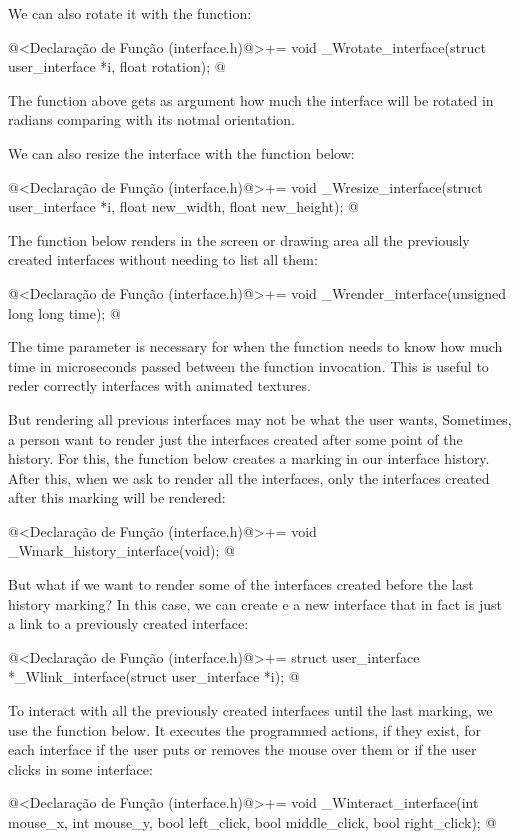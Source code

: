 We can also rotate it with the function:

\iniciocodigo
@<Declaração de Função (interface.h)@>+=
void _Wrotate_interface(struct user_interface *i, float rotation);
@
\fimcodigo

The function above gets as argument how much the interface will be
rotated in radians comparing with its notmal orientation.

We can also resize the interface with the function below:

\iniciocodigo
@<Declaração de Função (interface.h)@>+=
void _Wresize_interface(struct user_interface *i,
                        float new_width, float new_height);
@
\fimcodigo

The function below renders in the screen or drawing area all the
previously created interfaces without needing to list all them:

\iniciocodigo
@<Declaração de Função (interface.h)@>+=
void _Wrender_interface(unsigned long long time);
@
\fimcodigo

The time parameter is necessary for when the function needs to know
how much time in microseconds passed between the function
invocation. This is useful to reder correctly interfaces with animated
textures.

But rendering all previous interfaces may not be what the user wants,
Sometimes, a person want to render just the interfaces created after
some point of the history. For this, the function below creates a
marking in our interface history. After this, when we ask to render
all the interfaces, only the interfaces created after this marking
will be rendered:

\iniciocodigo
@<Declaração de Função (interface.h)@>+=
void _Wmark_history_interface(void);
@
\fimcodigo

But what if we want to render some of the interfaces created before
the last history marking? In this case, we can create e a new
interface that in fact is just a link to a previously created
interface:

\iniciocodigo
@<Declaração de Função (interface.h)@>+=
struct user_interface *_Wlink_interface(struct user_interface *i);
@
\fimcodigo

To interact with all the previously created interfaces until the last
marking, we use the function below. It executes the programmed
actions, if they exist, for each interface if the user puts or removes
the mouse over them or if the user clicks in some interface:

\iniciocodigo
@<Declaração de Função (interface.h)@>+=
void _Winteract_interface(int mouse_x, int mouse_y, bool left_click,
                          bool middle_click, bool right_click);
@
\fimcodigo


